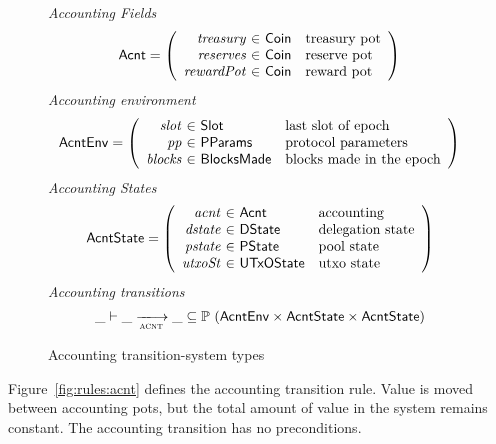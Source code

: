 \begin{figure}[htb]
  \emph{Accounting Fields}
  \begin{equation*}
    \Acnt =
    \left(
      \begin{array}{r@{~\in~}ll}
        \var{treasury} & \Coin & \text{treasury pot}\\
        \var{reserves} & \Coin & \text{reserve pot}\\
        \var{rewardPot} & \Coin & \text{reward pot}\\
      \end{array}
    \right)
  \end{equation*}
  \emph{Accounting environment}
  \begin{equation*}
    \AcntEnv =
    \left(
      \begin{array}{r@{~\in~}ll}
        \var{slot} & \Slot & \text{last slot of epoch}\\
        \var{pp} & \PParams & \text{protocol parameters}\\
        \var{blocks} & \BlocksMade & \text{blocks made in the epoch}\\
      \end{array}
    \right)
  \end{equation*}
  \emph{Accounting States}
  \begin{equation*}
    \AcntState =
    \left(
      \begin{array}{r@{~\in~}ll}
        \var{acnt} & \Acnt & \text{accounting}\\
        \var{dstate} & \DState & \text{delegation state}\\
        \var{pstate} & \PState & \text{pool state}\\
        \var{utxoSt} & \UTxOState & \text{utxo state}\\
      \end{array}
    \right)
  \end{equation*}
  \emph{Accounting transitions}
  \begin{equation*}
    \_ \vdash
    \var{\_} \trans{acnt}{} \var{\_}
    \subseteq \powerset (\AcntEnv \times \AcntState \times \AcntState)
  \end{equation*}
  \caption{Accounting transition-system types}
  \label{fig:ts-types:acnt}
\end{figure}

\clearpage

Figure~\ref{fig:rules:acnt} defines the accounting transition rule.  Value is moved between
accounting pots, but the total amount of value in the system remains constant.
The accounting transition has no preconditions.

